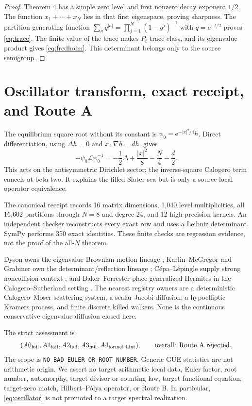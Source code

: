 \documentclass[10pt]{article}
\newcommand{\e}{\mathrm e}
\begin{document}
\begin{proof}
Theorem 4 has a simple zero level and first nonzero decay exponent $1/2$.
The function $x_1+\cdots+x_N$ lies in that first eigenspace, proving
sharpness.  The partition generating function
$\sum_\kappa q^{|\kappa|}=\prod_{j=1}^N(1-q^j)^{-1}$ with
$q=\e^{-t/2}$ proves \eqref{eq:trace}.  The finite value of the trace makes
$P_t$ trace class, and its eigenvalue product gives \eqref{eq:fredholm}.
This determinant belongs only to the source semigroup.
\end{proof}

\section{Oscillator transform, exact receipt, and Route A}

The equilibrium square root without its constant is
$\psi_0=\e^{-|x|^2/4}h$.  Direct differentiation, using $\Delta h=0$ and
$x\cdot\nabla h=dh$, gives
\begin{equation}
 -\psi_0\mathcal L\psi_0^{-1}
 =-\frac12\Delta+\frac{|x|^2}{8}-\frac N4-\frac d2.    \label{eq:oscillator}
\end{equation}
This acts on the antisymmetric Dirichlet sector; the inverse-square Calogero
term cancels at beta two.  It explains the filled Slater sea but is only a
source-local operator equivalence.

The canonical receipt records 16 matrix dimensions, 1,040 level
multiplicities, all 16,602 partitions through $N=8$ and degree 24, and 12
high-precision kernels.  An independent checker reconstructs every exact row
and uses a Leibniz determinant.  SymPy performs 350 exact identities.  These
finite checks are regression evidence, not the proof of the all-$N$ theorem.

Dyson owns the eigenvalue Brownian-motion lineage \cite{Dyson};
Karlin--McGregor and Grabiner own the determinant/reflection lineage
\cite{KM,Grabiner}; C\'epa--L\'epingle supply strong noncollision context
\cite{CL}; and Baker--Forrester place generalized Hermites in the
Calogero--Sutherland setting \cite{BF}.  The nearest registry owners are a
deterministic Calogero--Moser scattering system, a scalar Jacobi diffusion, a
hypoelliptic Kramers process, and finite discrete killed walkers.  None is the
continuous conservative eigenvalue diffusion closed here.

The strict assessment is
\begin{equation}
 (A0_{\rm fail},A1_{\rm fail},A2_{\rm fail},A3_{\rm fail},
 A4_{\rm formal\ hint}),\qquad \text{overall: Route A rejected}. \label{eq:route}
\end{equation}
The scope is \texttt{NO\_BAD\_EULER\_OR\_ROOT\_NUMBER}.  Generic GUE
statistics are not arithmetic origin.  We assert no target arithmetic local
data, Euler factor, root number, automorphy, target divisor or counting law,
target functional equation, target-zero match, Hilbert--P\'olya operator, or
Route B.  In particular, \eqref{eq:oscillator} is not promoted to a target
spectral realization.
\fi
\end{document}
